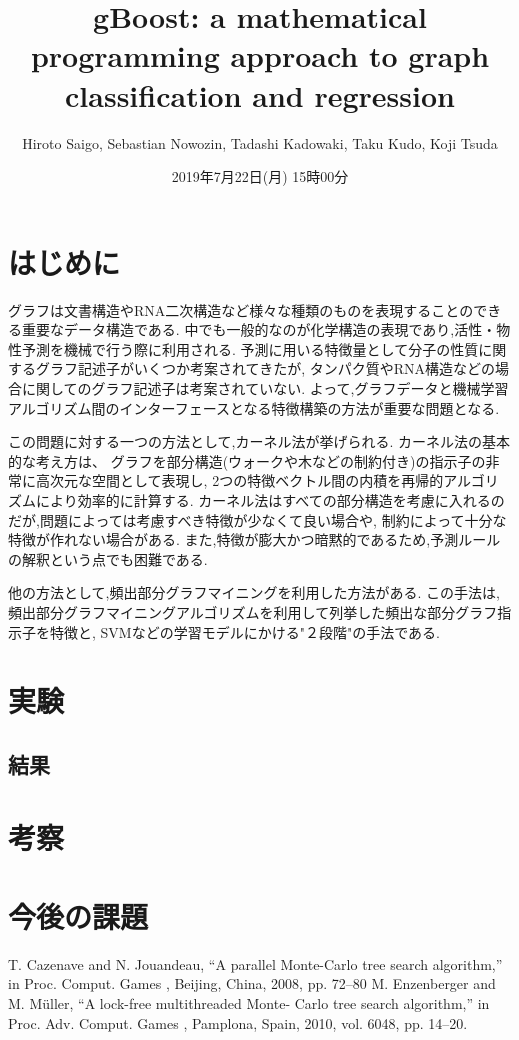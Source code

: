 \documentclass{zasshi-prml3}
\title{gBoost: a mathematical programming approach to graph classification and regression}  %
\date{2019年7月22日(月) 15時00分}      %
\author{Hiroto Saigo, Sebastian Nowozin, Tadashi Kadowaki, Taku Kudo, Koji Tsuda}    %
\begin{document}

\section{はじめに}
グラフは文書構造やRNA二次構造など様々な種類のものを表現することのできる重要なデータ構造である.
中でも一般的なのが化学構造の表現であり,活性・物性予測を機械で行う際に利用される.
予測に用いる特徴量として分子の性質に関するグラフ記述子がいくつか考案されてきたが,
タンパク質やRNA構造などの場合に関してのグラフ記述子は考案されていない.
よって,グラフデータと機械学習アルゴリズム間のインターフェースとなる特徴構築の方法が重要な問題となる.

この問題に対する一つの方法として,カーネル法が挙げられる.
カーネル法の基本的な考え方は、
グラフを部分構造(ウォークや木などの制約付き)の指示子の非常に高次元な空間として表現し,
2つの特徴ベクトル間の内積を再帰的アルゴリズムにより効率的に計算する.
カーネル法はすべての部分構造を考慮に入れるのだが,問題によっては考慮すべき特徴が少なくて良い場合や,
制約によって十分な特徴が作れない場合がある.
また,特徴が膨大かつ暗黙的であるため,予測ルールの解釈という点でも困難である.

他の方法として,頻出部分グラフマイニングを利用した方法がある.
この手法は,頻出部分グラフマイニングアルゴリズムを利用して列挙した頻出な部分グラフ指示子を特徴と,
SVMなどの学習モデルにかける"２段階"の手法である.


\section{実験}

\subsection{結果}

\section{考察}

\section{今後の課題}

\begin{thebibliography}{9}
T. Cazenave and N. Jouandeau, “A
parallel Monte-Carlo tree search
algorithm,” in
Proc. Comput. Games
, Beijing, China, 2008, pp. 72–80
M. Enzenberger and M. Müller, “A
lock-free multithreaded Monte-
Carlo tree search algorithm,” in
Proc. Adv. Comput. Games
, Pamplona,
Spain, 2010, vol. 6048, pp. 14–20.
\end{thebibliography}
\end{document}
